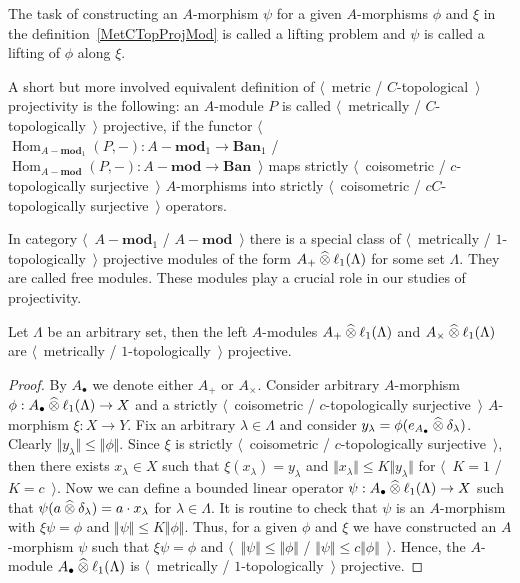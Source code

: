 The task of constructing an $A$-morphism $\psi$ for a given $A$-morphisms $\phi$ 
and $\xi$ in the definition~\ref{MetCTopProjMod} is called a lifting problem 
and $\psi$ is called a lifting of $\phi$ along $\xi$.

A short but more involved equivalent definition 
of $\langle$~metric / $C$-topological~$\rangle$ projectivity is the following: 
an $A$-module $P$ is called $\langle$~metrically / $C$-topologically~$\rangle$ 
projective, if the functor
$\langle$~$\operatorname{Hom}_{A-\mathbf{mod}_1}(P,-)
:A-\mathbf{mod}_1\to\mathbf{Ban}_1$
/
$\operatorname{Hom}_{A-\mathbf{mod}}(P,-)
:A-\mathbf{mod}\to\mathbf{Ban}$~$\rangle$
maps strictly $\langle$~coisometric / $c$-topologically surjective~$\rangle$
$A$-morphisms into strictly $\langle$~coisometric / 
$c C$-topologically surjective~$\rangle$ operators. 

In category $\langle$~$A-\mathbf{mod}_1$ / $A-\mathbf{mod}$~$\rangle$ there
is a special class of $\langle$~metrically / $1$-topologically~$\rangle$
projective modules of the form $A_+\mathbin{\widehat{\otimes}} \ell_1(\Lambda)$ for 
some set $\Lambda$. They are called free modules. These modules play a crucial 
role in our studies of projectivity.

\begin{proposition}\label{MetCTopFreeMod} Let $\Lambda$ be an arbitrary 
set, then the left $A$-modules $A_+ \mathbin{\widehat{\otimes}} \ell_1(\Lambda)$ 
and $A_\times \mathbin{\widehat{\otimes}} \ell_1(\Lambda)$ 
are $\langle$~metrically / $1$-topologically~$\rangle$ projective. 
\end{proposition}
\begin{proof} By $A_\bullet$ we denote either $A_+$ or $A_\times$. 
Consider arbitrary $A$-morphism 
$\phi:A_\bullet\mathbin{\widehat{\otimes}}\ell_1(\Lambda)\to X$ and a 
strictly $\langle$~coisometric / $c$-topologically surjective~$\rangle$ 
$A$-morphism $\xi:X\to Y$. Fix an arbitrary $\lambda\in\Lambda$ and 
consider $y_\lambda=\phi(e_{A_\bullet}\mathbin{\widehat{\otimes}} \delta_\lambda)$. 
Clearly $\Vert y_\lambda\Vert\leq \Vert\phi\Vert$. Since $\xi$ is 
strictly $\langle$~coisometric / $c$-topologically surjective~$\rangle$, 
then there exists $x_\lambda\in X$ such that $\xi(x_\lambda)=y_\lambda$
and $\Vert x_\lambda\Vert\leq K\Vert y_\lambda\Vert$ for $\langle$~$K=1$ / 
$K=c$~$\rangle$. Now we can define a bounded linear operator
$\psi:A_\bullet\mathbin{\widehat{\otimes}} \ell_1(\Lambda)\to X$ such that 
$\psi(a\mathbin{\widehat{\otimes}} \delta_\lambda)=a\cdot x_\lambda$ for $\lambda\in\Lambda$. 
It is routine to check that $\psi$ is an $A$-morphism with $\xi\psi=\phi$ 
and $\Vert\psi\Vert\leq K\Vert\phi\Vert$. Thus, for a given $\phi$ and $\xi$
we have constructed an $A$-morphism $\psi$ such that $\xi\psi=\phi$ and
$\langle$~$\Vert\psi\Vert\leq \Vert\phi\Vert$ / $\Vert\psi\Vert\leq
c\Vert\phi\Vert$~$\rangle$. Hence, the $A$-module $A_\bullet\mathbin{\widehat{\otimes}}
\ell_1(\Lambda)$ is $\langle$~metrically / $1$-topologically~$\rangle$
projective.
\end{proof}


